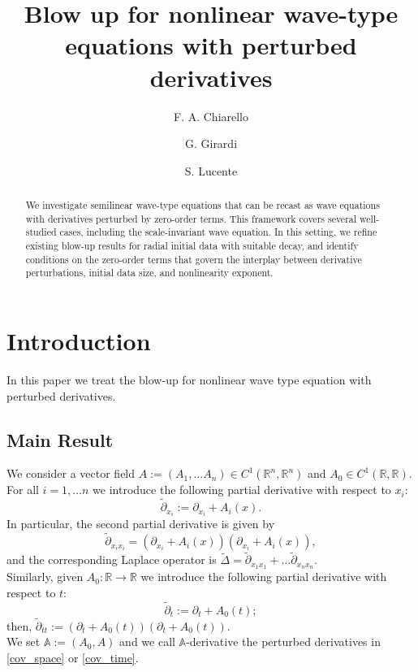 \documentclass[11pt,reqno]{amsart}
\title{Blow up for nonlinear wave-type equations with perturbed derivatives}
\author{F. A. Chiarello}
\author{G. Girardi}
\author{S. Lucente}
\date{}
\theoremstyle{definition}
\numberwithin{equation}{section}
\newcommand{\R}{\mathbb{R}}
\newcommand{\A}{\mathbb{A}}
\begin{document}
\baselineskip16pt

\maketitle



\begin{abstract}
We investigate semilinear wave-type equations that can be recast as wave equations with derivatives perturbed by zero-order terms. This framework covers several well-studied cases, including the scale-invariant wave equation. In this setting, we refine existing blow-up results for radial initial data with suitable decay, and identify conditions on the zero-order terms that govern the interplay between derivative perturbations, initial data size, and nonlinearity exponent.
 \end{abstract}

 

\section{Introduction}

In this paper we treat the blow-up for nonlinear wave type equation with perturbed derivatives. 

\subsection{Main Result}

We consider a vector field $A:=( A_1,\dots A_n)\in C^1(\R^n,\R^n)$ and $A_0\in C^1(\R,\R)$. 
For all $i=1, \dots n$ we introduce the following partial derivative with respect to $x_i$:
%
\begin{equation}\label{cov_space}
\tilde{\partial}_{x_i}:=\partial_{x_i}+A_i(x).
\end{equation}
In particular, the second partial derivative is given by
\[\tilde \partial_{x_ix_i}=(\partial_{x_i}+ A_i(x))(\partial_{x_i}+A_i(x)),\]
%
and the corresponding Laplace operator is $\tilde \Delta =\tilde \partial_{x_1x_1}+\dots \tilde \partial_{x_nx_n} $.\\
Similarly, given $ A_0:\R\to \R$ we introduce the following partial derivative with respect to $t$:
%
\begin{equation}\label{cov_time}
\tilde{\partial}_t:=\partial_t+  A_0(t);
\end{equation}
%
then, $\tilde\partial_{tt}:=(\partial_t+  A_0(t))(\partial_t+ A_0(t))$. \\
%
We set $\A:=(A_0,A)$ and we call $\A$-derivative the perturbed derivatives in \eqref{cov_space} or \eqref{cov_time}.
\end{document}
